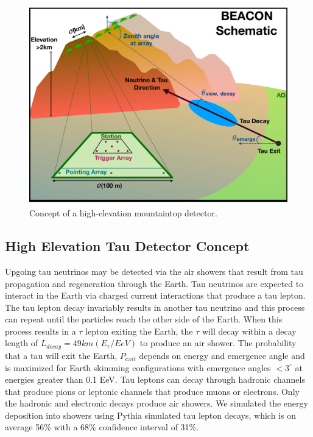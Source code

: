 \documentclass{PoS}
\begin{document}
\begin{figure}[htbp]
\begin{center}
\includegraphics[width=\textwidth]{figures/BEACON_ICRC_Concept.pdf}
\caption{Concept of a high-elevation mountaintop detector.}
\label{fig:concept}
\end{center}
\end{figure}

\subsection{High Elevation Tau Detector Concept}

Upgoing tau neutrinos may be detected via the air showers that result from tau propagation and regeneration through the Earth. Tau neutrinos are expected to interact in the Earth via charged current interactions that produce a tau lepton.%
The tau lepton decay invariably results in another tau neutrino and this process can repeat until the particles reach the other side of the Earth. When this process results in a $\tau$ lepton exiting the Earth, the $\tau$ will decay within a decay length of $L_{decay} = 49 km (E_\tau/EeV)$ to produce an air shower. The probability that a tau will exit the Earth, $P_{exit}$ depends on energy and emergence angle and is maximized for Earth skimming configurations with emergence angles $<3^{\circ}$ at energies greater than 0.1 EeV.  Tau leptons can decay through hadronic channels that produce pions or leptonic channels that produce muons or electrons. Only the hadronic and electronic decays produce air showers. We simulated the energy deposition into showers using Pythia simulated tau lepton decays, which is on average 56\% with a 68\% confidence interval of 31\%. 
\end{document}
